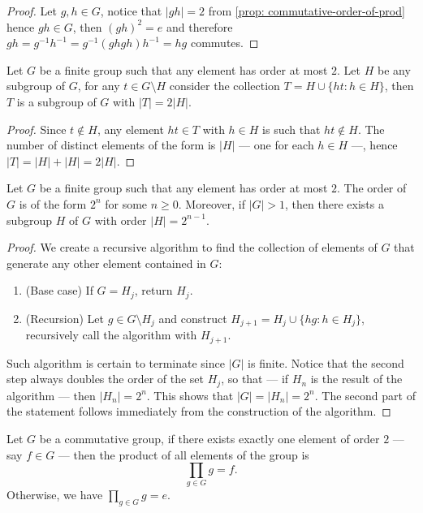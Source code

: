 \begin{proof}
Let \(g, h \in G\), notice that \(|gh| = 2\) from \cref{prop:
commutative-order-of-prod} hence \(gh \in G\), then \((gh)^2 = e\) and
therefore \(gh = g^{-1} h^{-1} = g^{-1}(ghgh)h^{-1} = hg\) commutes.
\end{proof}

\begin{lemma}
Let \(G\) be a finite group such that any element has order at most \(2\). Let
\(H\) be any subgroup of \(G\), for any \(t \in G \setminus H\) consider the
collection \(T = H \cup \{h t : h \in H\}\), then \(T\) is a subgroup of \(G\)
with \(|T| = 2|H|\).
\end{lemma}

\begin{proof}
Since \(t \not\in H\), any element \(ht \in T\) with \(h \in H\) is such that
\(ht \not\in H\). The number of distinct elements of the form is \(|H|\) ---
one for each \(h \in H\) ---, hence \(|T| = |H| + |H| = 2|H|\).
\end{proof}

\begin{lemma}[Order \(2^n\)]\label{lem: order-2n}
Let \(G\) be a finite group such that any element has order at most \(2\). The
order of \(G\) is of the form \(2^n\) for some \(n \geq 0\). Moreover, if
\(|G| > 1\), then there exists a subgroup \(H\) of \(G\) with order \(|H| =
2^{n-1}\).
\end{lemma}

\begin{proof}
We create a recursive algorithm to find the collection of elements of \(G\)
that generate any other element contained in \(G\):
\begin{enumerate}
  \item (Base case) If \(G = H_j\), return \(H_j\).
  \item (Recursion) Let \(g \in G \setminus H_j\) and construct \(H_{j + 1} =
    H_j \cup \{h g: h \in H_j\}\), recursively call the algorithm with \(H_{j
    + 1}\).
\end{enumerate}
Such algorithm is certain to terminate since \(|G|\) is finite. Notice that
the second step always doubles the order of the set \(H_j\), so that --- if
\(H_n\) is the result of the algorithm --- then \(|H_n| = 2^n\). This shows
that \(|G| = |H_n| = 2^n\). The second part of the statement follows
immediately from the construction of the algorithm.
\end{proof}

\begin{proposition}
Let \(G\) be a commutative group, if there exists exactly one element of order
\(2\) --- say \(f \in G\) --- then the product of all elements of the group is
\[
  \prod_{g \in G} g = f.
\]
Otherwise, we have \(\prod_{g \in G} g = e\).
\end{proposition}

